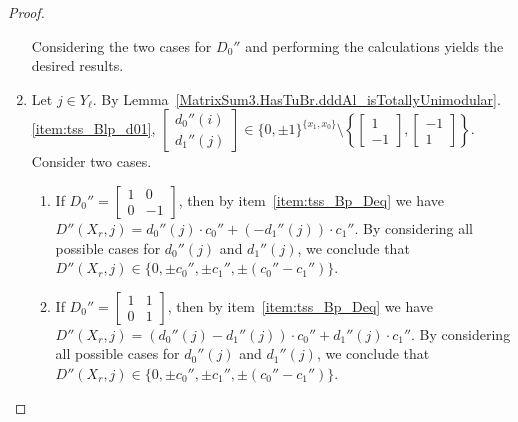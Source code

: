 \begin{proof}
\begin{enumerate}
\[        \]
        Considering the two cases for $D_{0}''$ and performing the calculations yields the desired results.

        \item Let $j \in Y_{\ell}$. By Lemma~\ref{MatrixSum3.HasTuBr.dddAl_isTotallyUnimodular}.\ref{item:tss_Blp_d01}, $\begin{bmatrix} d_{0}'' (i) \\ d_{1}'' (j) \end{bmatrix} \in \{0, \pm 1\}^{\{x_{1}, x_{0}\}} \setminus \left\{ \begin{bmatrix} 1 \\ -1 \end{bmatrix}, \begin{bmatrix} -1 \\ 1 \end{bmatrix} \right\}$. Consider two cases.
        \begin{enumerate}
            \item If $D_{0}'' = \begin{bmatrix} 1 & 0 \\ 0 & -1 \end{bmatrix}$, then by item~\ref{item:tss_Bp_Deq} we have $D'' (X_{r}, j) = d_{0}'' (j) \cdot c_{0}''  + (-d_{1}'' (j)) \cdot c_{1}''$. By considering all possible cases for $d_{0}'' (j)$ and $d_{1}'' (j)$, we conclude that $D'' (X_{r}, j) \in \{0, \pm c_{0}'', \pm c_{1}'', \pm (c_{0}'' - c_{1}'')\}$.
            \item If $D_{0}'' = \begin{bmatrix} 1 & 1 \\ 0 & 1 \end{bmatrix}$, then by item~\ref{item:tss_Bp_Deq} we have $D'' (X_{r}, j) = (d_{0}'' (j) - d_{1}'' (j)) \cdot c_{0}''  + d_{1}'' (j) \cdot c_{1}''$. By considering all possible cases for $d_{0}'' (j)$ and $d_{1}'' (j)$, we conclude that $D'' (X_{r}, j) \in \{0, \pm c_{0}'', \pm c_{1}'', \pm (c_{0}'' - c_{1}'')\}$.
        \end{enumerate}


\end{enumerate}
\end{proof}
